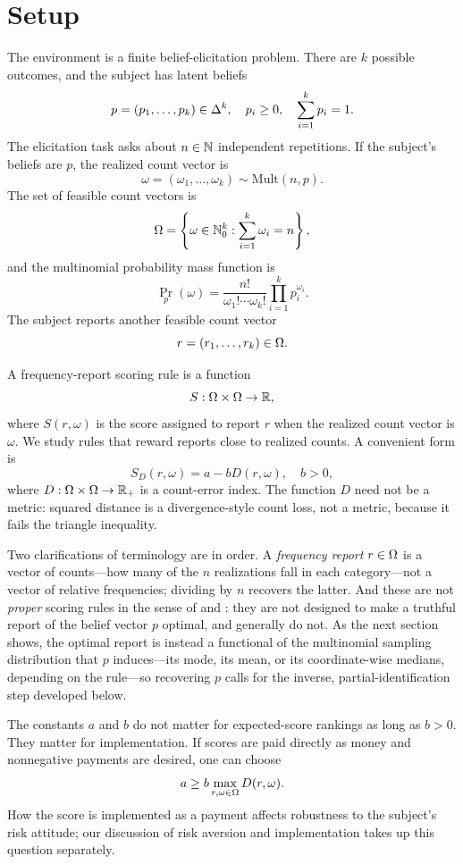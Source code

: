 \section{Setup}

The environment is a finite belief-elicitation problem.
There are \(k\) possible outcomes, and the subject has latent beliefs
\[
p=(p_1,\ldots,p_k)\in\Delta^k,
\quad
p_i\ge 0,
\quad
\sum_{i=1}^k p_i=1.
\]
The elicitation task asks about \(n\in\mathbb{N}\) independent repetitions.
If the subject's beliefs are \(p\), the realized count vector is
\[
\omega=(\omega_1,\ldots,\omega_k)\sim \mathrm{Mult}(n,p).
\]
The set of feasible count vectors is
\[
\Omega=\left\{\omega\in\mathbb{N}_0^k:\sum_{i=1}^k \omega_i=n\right\},
\]
and the multinomial probability mass function is
\[
\Pr_p(\omega)
=
\frac{n!}{\omega_1!\cdots \omega_k!}
\prod_{i=1}^k p_i^{\omega_i}.
\]
The subject reports another feasible count vector
\[
r=(r_1,\ldots,r_k)\in\Omega.
\]

\begin{definition}
A frequency-report scoring rule is a function
\[
S:\Omega\times\Omega\to\mathbb{R},
\]
where \(S(r,\omega)\) is the score assigned to report \(r\) when the realized count vector is \(\omega\).
We study rules that reward reports close to realized counts.
A convenient form is
\[
S_D(r,\omega)=a-bD(r,\omega),
\quad b>0,
\]
where \(D:\Omega\times\Omega\to\mathbb{R}_+\) is a count-error index.
The function \(D\) need not be a metric: squared distance is a divergence-style count loss, not a metric, because it fails the triangle inequality.
\end{definition}

Two clarifications of terminology are in order.
A \emph{frequency report} \(r\in\Omega\) is a vector of counts---how many of the \(n\) realizations fall in each category---not a vector of relative frequencies; dividing by \(n\) recovers the latter.
And these are not \emph{proper} scoring rules in the sense of \citet{Savage1971} and \citet{GneitingRaftery2007}: they are not designed to make a truthful report of the belief vector \(p\) optimal, and generally do not.
As the next section shows, the optimal report is instead a functional of the multinomial sampling distribution that \(p\) induces---its mode, its mean, or its coordinate-wise medians, depending on the rule---so recovering \(p\) calls for the inverse, partial-identification step developed below.

The constants \(a\) and \(b\) do not matter for expected-score rankings as long as \(b>0\).
They matter for implementation.
If scores are paid directly as money and nonnegative payments are desired, one can choose
\[
a\ge b\max_{r,\omega\in\Omega}D(r,\omega).
\]
How the score is implemented as a payment affects robustness to the subject's risk attitude; our discussion of risk aversion and implementation takes up this question separately.

